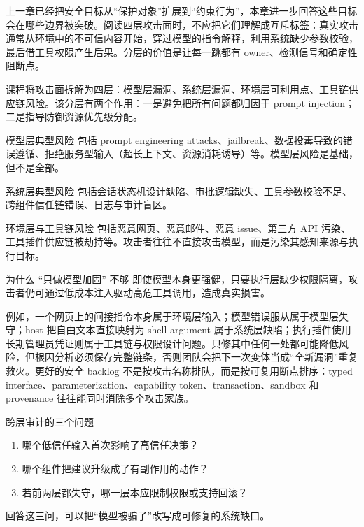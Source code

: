 \documentclass[a4paper]{article}
\begin{document}
上一章已经把安全目标从“保护对象”扩展到“约束行为”，本章进一步回答这些目标会在哪些边界被突破。阅读四层攻击面时，不应把它们理解成互斥标签：真实攻击通常从环境中的不可信内容开始，穿过模型的指令解释，利用系统缺少参数校验，最后借工具权限产生后果。分层的价值是让每一跳都有 owner、检测信号和确定性阻断点。

课程将攻击面拆解为四层：模型层漏洞、系统层漏洞、环境层可利用点、工具链供应链风险。该分层有两个作用：一是避免把所有问题都归因于 prompt injection；二是指导防御资源优先级分配。

\begin{knowledgebox}{模型层典型风险}
包括 prompt engineering attacks、jailbreak、数据投毒导致的错误遵循、拒绝服务型输入（超长上下文、资源消耗诱导）等。模型层风险是基础，但不是全部。
\end{knowledgebox}

\begin{knowledgebox}{系统层典型风险}
包括会话状态机设计缺陷、审批逻辑缺失、工具参数校验不足、跨组件信任链错误、日志与审计盲区。
\end{knowledgebox}

\begin{knowledgebox}{环境层与工具链风险}
包括恶意网页、恶意邮件、恶意 issue、第三方 API 污染、工具插件供应链被劫持等。攻击者往往不直接攻击模型，而是污染其感知来源与执行目标。
\end{knowledgebox}

\begin{warningbox}{为什么 ``只做模型加固'' 不够}
即使模型本身更强健，只要执行层缺少权限隔离，攻击者仍可通过低成本注入驱动高危工具调用，造成真实损害。
\end{warningbox}

例如，一个网页上的间接指令本身属于环境层输入；模型错误服从属于模型层失守；host 把自由文本直接映射为 shell argument 属于系统层缺陷；执行插件使用长期管理员凭证则属于工具链与权限设计问题。只修其中任何一处都可能降低风险，但根因分析必须保存完整链条，否则团队会把下一次变体当成“全新漏洞”重复救火。更好的安全 backlog 不是按攻击名称排队，而是按可复用断点排序：typed interface、parameterization、capability token、transaction、sandbox 和 provenance 往往能同时消除多个攻击家族。

\begin{knowledgebox}{跨层审计的三个问题}
\begin{enumerate}
    \item 哪个低信任输入首次影响了高信任决策？
    \item 哪个组件把建议升级成了有副作用的动作？
    \item 若前两层都失守，哪一层本应限制权限或支持回滚？
\end{enumerate}
回答这三问，可以把“模型被骗了”改写成可修复的系统缺口。
\end{knowledgebox}
\end{document}
